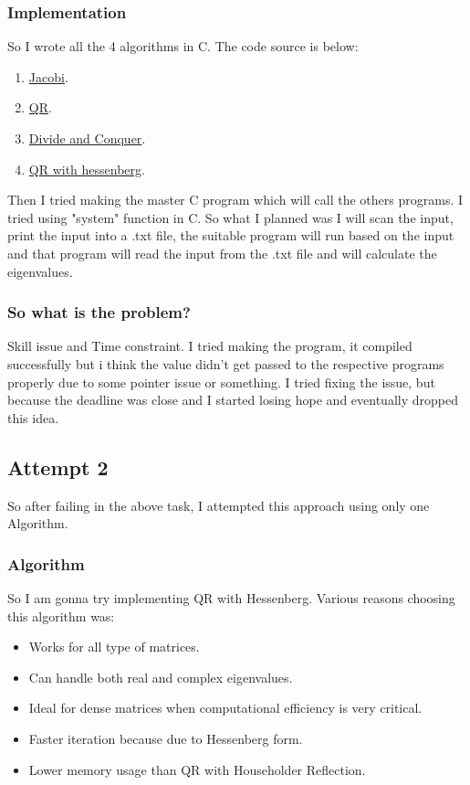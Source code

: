 \documentclass[12pt,oneside,letterpaper,english]{article}
\begin{document}
\subsubsection{Implementation}
So I wrote all the 4 algorithms in C. The code source is below: 
\begin{enumerate}
    \item \href{https://github.com/igiamronit/Software-assignment/blob/451c51466abd68364a245c534d87f55b77e8d1b8/EigenValue%20Algo/Divide%20and%20Conq/dnc.c}{Jacobi}.
    \item \href{https://github.com/igiamronit/Software-assignment/blob/main/EigenValue%20Algo/qr_algo/qr.c}{QR}.
    \item \href{https://github.com/igiamronit/Software-assignment/blob/main/EigenValue%20Algo/Divide%20and%20Conq/dnc.c}{Divide and Conquer}.
    \item \href{https://github.com/igiamronit/Software-assignment/tree/main/EigenValue%20Algo/qr%20with%20hessenberg}{QR with hessenberg}.
\end{enumerate}
Then I tried making the master C program which will call the others programs. I tried using "system" function in C. So what I planned was I will scan the input, print the input into a .txt file, the suitable program will run based on the input and that program will read the input from the .txt file and will calculate the eigenvalues.

\subsubsection{So what is the problem?}
\noindent Skill issue and Time constraint. I tried making the program, it compiled successfully but i think the value didn't get passed to the respective programs properly due to some pointer issue or something. I tried fixing the issue, but because the deadline was close and I started losing hope and eventually dropped this idea.

\subsection{Attempt 2}
\noindent So after failing in the above task, I attempted this approach using only one Algorithm.
\subsubsection{Algorithm}
\noindent So I am gonna try implementing QR with Hessenberg. Various reasons choosing this algorithm was:
\begin{itemize}
    \item Works for all type of matrices.
    \item Can handle both real and complex eigenvalues.
    \item Ideal for dense matrices when computational efficiency is very critical.
    \item Faster iteration because due to Hessenberg form.
    \item Lower memory usage than QR with Householder Reflection.
\end{itemize}
\end{document}
